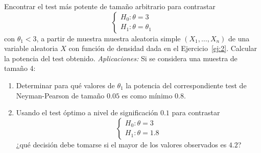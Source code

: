 \documentclass[12pt]{article}
\begin{document}
    \begin{ejercicio}
        Encontrar el test más potente de tamaño arbitrario para contrastar
        \begin{equation*}
            \left\{\begin{array}{l}
                H_0: \theta = 3 \\
                H_1 : \theta = \theta_1
            \end{array}\right.
        \end{equation*}
        con $\theta_1<3$, a partir de muestra muestra aleatoria simple $(X_1,\ldots,X_n)$ de una variable aleatoria $X$ con función de densidad dada en el Ejercicio~\ref{ej:2}. Calcular la potencia del test obtenido.\newline
        \textit{Aplicaciones:} Si se considera una muestra de tamaño 4:
        \begin{enumerate}[label=\alph*)]
            \item Determinar para qué valores de $\theta_1$ la potencia del correspondiente test de Neyman-Pearson de tamaño $0.05$ es como mínimo $0.8$.
            \item Usando el test óptimo a nivel de significación $0.1$ para contrastar
            \begin{equation*}
                \left\{\begin{array}{l}
                    H_0: \theta = 3 \\
                    H_1 : \theta = 1.8
                \end{array}\right.
            \end{equation*}
            ¿qué decisión debe tomarse si el mayor de los valores observados es $4.2$?
        \end{enumerate}
    \end{ejercicio}
\end{document}
